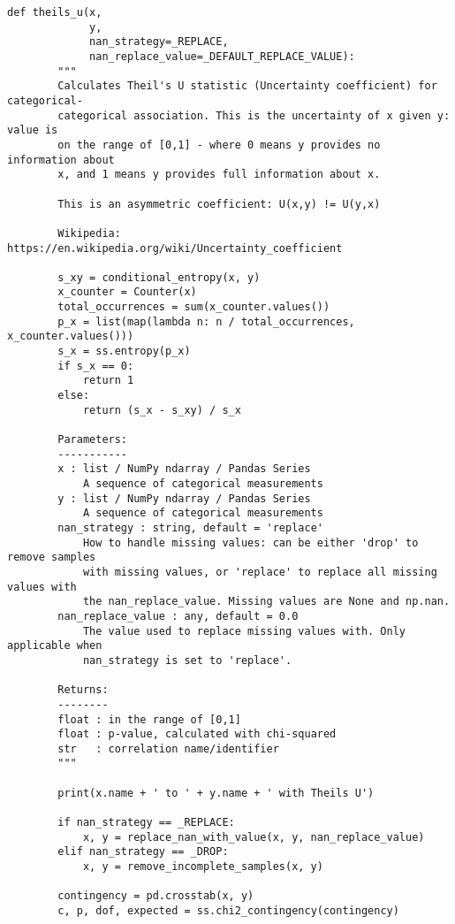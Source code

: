 \begin{lstlisting}[basicstyle=\tiny, style=py, caption={Compute Correlation Function}, label=lst:compute_correlation]
    def theils_u(x,
             y,
             nan_strategy=_REPLACE,
             nan_replace_value=_DEFAULT_REPLACE_VALUE):
        """
        Calculates Theil's U statistic (Uncertainty coefficient) for categorical-
        categorical association. This is the uncertainty of x given y: value is
        on the range of [0,1] - where 0 means y provides no information about
        x, and 1 means y provides full information about x.

        This is an asymmetric coefficient: U(x,y) != U(y,x)

        Wikipedia: https://en.wikipedia.org/wiki/Uncertainty_coefficient

        s_xy = conditional_entropy(x, y)
        x_counter = Counter(x)
        total_occurrences = sum(x_counter.values())
        p_x = list(map(lambda n: n / total_occurrences, x_counter.values()))
        s_x = ss.entropy(p_x)
        if s_x == 0:
            return 1
        else:
            return (s_x - s_xy) / s_x

        Parameters:
        -----------
        x : list / NumPy ndarray / Pandas Series
            A sequence of categorical measurements
        y : list / NumPy ndarray / Pandas Series
            A sequence of categorical measurements
        nan_strategy : string, default = 'replace'
            How to handle missing values: can be either 'drop' to remove samples
            with missing values, or 'replace' to replace all missing values with
            the nan_replace_value. Missing values are None and np.nan.
        nan_replace_value : any, default = 0.0
            The value used to replace missing values with. Only applicable when
            nan_strategy is set to 'replace'.

        Returns:
        --------
        float : in the range of [0,1]
        float : p-value, calculated with chi-squared
        str   : correlation name/identifier
        """

        print(x.name + ' to ' + y.name + ' with Theils U')

        if nan_strategy == _REPLACE:
            x, y = replace_nan_with_value(x, y, nan_replace_value)
        elif nan_strategy == _DROP:
            x, y = remove_incomplete_samples(x, y)

        contingency = pd.crosstab(x, y)
        c, p, dof, expected = ss.chi2_contingency(contingency)


\end{lstlisting}
